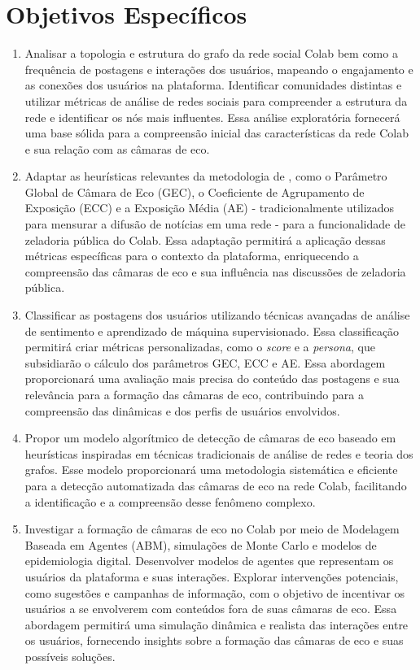 \section{Objetivos Específicos}
\begin{enumerate}
	\item Analisar a topologia e estrutura do grafo da rede social Colab bem como a frequência de postagens e interações dos usuários, mapeando o engajamento e as conexões dos usuários na plataforma. Identificar comunidades distintas e utilizar métricas de análise de redes sociais para compreender a estrutura da rede e identificar os nós mais influentes. Essa análise exploratória fornecerá uma base sólida para a compreensão inicial das características da rede Colab e sua relação com as câmaras de eco.

	\item Adaptar as heurísticas relevantes da metodologia de , como o Parâmetro Global de Câmara de Eco (GEC), o Coeficiente de Agrupamento de Exposição (ECC) e a Exposição Média (AE) - tradicionalmente utilizados para mensurar a difusão de notícias em uma rede - para a funcionalidade de zeladoria pública do Colab. Essa adaptação permitirá a aplicação dessas métricas específicas para o contexto da plataforma, enriquecendo a compreensão das câmaras de eco e sua influência nas discussões de zeladoria pública.

	\item Classificar as postagens dos usuários utilizando técnicas avançadas de análise de sentimento e aprendizado de máquina supervisionado. Essa classificação permitirá criar métricas personalizadas, como o \textit{score} e a \textit{persona}, que subsidiarão o cálculo dos parâmetros GEC, ECC e AE. Essa abordagem proporcionará uma avaliação mais precisa do conteúdo das postagens e sua relevância para a formação das câmaras de eco, contribuindo para a compreensão das dinâmicas e dos perfis de usuários envolvidos.

	\item Propor um modelo algorítmico de detecção de câmaras de eco baseado em heurísticas inspiradas em técnicas tradicionais de análise de redes e teoria dos grafos. Esse modelo proporcionará uma metodologia sistemática e eficiente para a detecção automatizada das câmaras de eco na rede Colab, facilitando a identificação e a compreensão desse fenômeno complexo.

	\item Investigar a formação de câmaras de eco no Colab por meio de Modelagem Baseada em Agentes (ABM), simulações de Monte Carlo e modelos de epidemiologia digital. Desenvolver modelos de agentes que representam os usuários da plataforma e suas interações. Explorar intervenções potenciais, como sugestões e campanhas de informação, com o objetivo de incentivar os usuários a se envolverem com conteúdos fora de suas câmaras de eco. Essa abordagem permitirá uma simulação dinâmica e realista das interações entre os usuários, fornecendo insights sobre a formação das câmaras de eco e suas possíveis soluções.


\end{enumerate}
